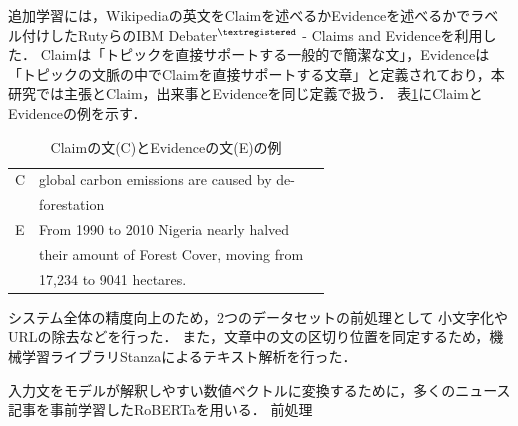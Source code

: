 \documentclass[a4paper, twocolumn, 10pt]{jarticle}
\makeatletter
\def\subsection{%
	\@startsection{subsection}{1}{\z@}%
	{.1\Cvs \@plus.1\Cdp \@minus.1\Cdp}%
	{.1\Cvs \@plus.1\Cdp}%
	{\normalfont\normalsize\bfseries}%
}
\makeatother
\begin{document}
追加学習には，Wikipediaの英文をClaimを述べるかEvidenceを述べるかでラベル付けしたRutyらのIBM Debater$^{\textregistered}$ - Claims and Evidenceを利用した\cite{rinott_show_2015}．
Claimは「トピックを直接サポートする一般的で簡潔な文」，Evidenceは「トピックの文脈の中でClaimを直接サポートする文章」と定義されており，本研究では主張とClaim，出来事とEvidenceを同じ定義で扱う．
表\ref{claim_evidence_example}にClaimとEvidenceの例を示す．

\begin{table}[h]
  \caption{Claimの文(C)とEvidenceの文(E)の例}
  \centering
  \begin{tabular}{llp{6cm}}
    \hline
    C & global carbon emissions are caused by de-
    \\
    & forestation
    \\
    E & From 1990 to 2010 Nigeria nearly halved
    \\
    & their amount of Forest Cover, moving from
    \\
    & 17,234 to 9041 hectares.
    \\
    \hline
  \end{tabular}
  \label{claim_evidence_example}
\end{table}

システム全体の精度向上のため，2つのデータセットの前処理として
小文字化やURLの除去などを行った．
また，文章中の文の区切り位置を同定するため，機械学習ライブラリStanzaによるテキスト解析を行った\cite{qi_stanza_2020}．






入力文をモデルが解釈しやすい数値ベクトルに変換するために，多くのニュース記事を事前学習したRoBERTaを用いる．
前処理

\end{document}
